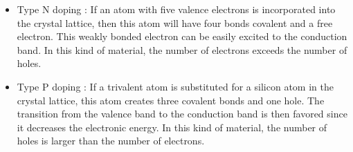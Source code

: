 \documentclass{report}
\begin{document}
\begin{itemize} 
    \item Type N doping : If an atom with five valence electrons is incorporated into the crystal lattice, then this atom will have four bonds covalent and a free electron. This weakly bonded electron can be easily excited to the conduction band. In this kind of material, the number of electrons exceeds the number of holes.
    \item Type P doping : If a trivalent atom is substituted for a silicon atom in the crystal lattice, this atom creates three covalent bonds and one hole. The transition from the valence band to the conduction band is then favored since it decreases the electronic energy. In this kind of material, the number of holes is larger than the number of electrons.
\end{itemize}
\end{document}
